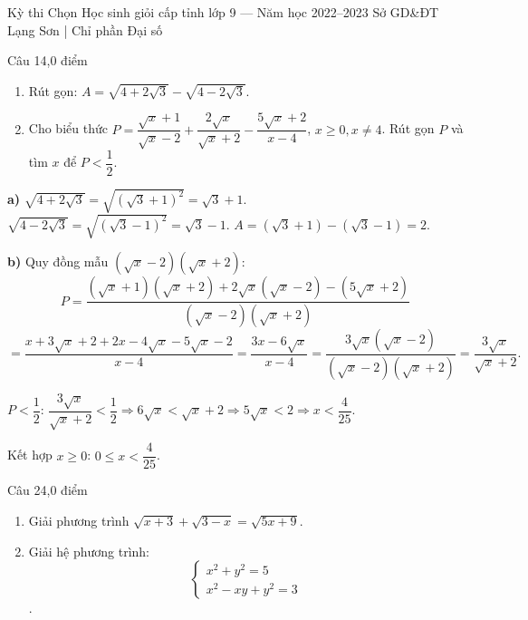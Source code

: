 ﻿%
%
  {Kỳ thi Chọn Học sinh giỏi cấp tỉnh lớp 9 — Năm học 2022--2023}%
  {Sở GD\&ĐT Lạng Sơn | Chỉ phần Đại số}

\begin{de_cau}{Câu 1}{4,0 điểm}
\begin{enumerate}[label=\alph*)]
\item Rút gọn: $A=\sqrt{4+2\sqrt{3}}-\sqrt{4-2\sqrt{3}}$.
\item Cho biểu thức $P=\dfrac{\sqrt{x}+1}{\sqrt{x}-2}+\dfrac{2\sqrt{x}}{\sqrt{x}+2}-\dfrac{5\sqrt{x}+2}{x-4}$,
$x\geq 0, x\neq 4$. Rút gọn $P$ và tìm $x$ để $P<\dfrac{1}{2}$.
\end{enumerate}
\end{de_cau}

\begin{loi_giai_cau}
\textbf{a)} $\sqrt{4+2\sqrt{3}}=\sqrt{(\sqrt{3}+1)^2}=\sqrt{3}+1$.
$\sqrt{4-2\sqrt{3}}=\sqrt{(\sqrt{3}-1)^2}=\sqrt{3}-1$.
$A=(\sqrt{3}+1)-(\sqrt{3}-1)=\boxed{2}$.

\textbf{b)} Quy đồng mẫu $(\sqrt{x}-2)(\sqrt{x}+2)$:
\[P=\frac{(\sqrt{x}+1)(\sqrt{x}+2)+2\sqrt{x}(\sqrt{x}-2)-(5\sqrt{x}+2)}{(\sqrt{x}-2)(\sqrt{x}+2)}\]
\[=\frac{x+3\sqrt{x}+2+2x-4\sqrt{x}-5\sqrt{x}-2}{x-4}=\frac{3x-6\sqrt{x}}{x-4}=\frac{3\sqrt{x}(\sqrt{x}-2)}{(\sqrt{x}-2)(\sqrt{x}+2)}=\frac{3\sqrt{x}}{\sqrt{x}+2}.\]

$P<\dfrac{1}{2}$: $\dfrac{3\sqrt{x}}{\sqrt{x}+2}<\dfrac{1}{2}\Rightarrow 6\sqrt{x}<\sqrt{x}+2\Rightarrow 5\sqrt{x}<2\Rightarrow x<\dfrac{4}{25}$.

Kết hợp $x\geq 0$: $\boxed{0\leq x<\dfrac{4}{25}}$.
\end{loi_giai_cau}

\begin{de_cau}{Câu 2}{4,0 điểm}
\begin{enumerate}[label=\alph*)]
\item Giải phương trình $\sqrt{x+3}+\sqrt{3-x}=\sqrt{5x+9}$.
\item Giải hệ phương trình: 
\[ \begin{cases}x^2+y^2=5\\x^2-xy+y^2=3\end{cases} \].
\end{enumerate}
\end{de_cau}

